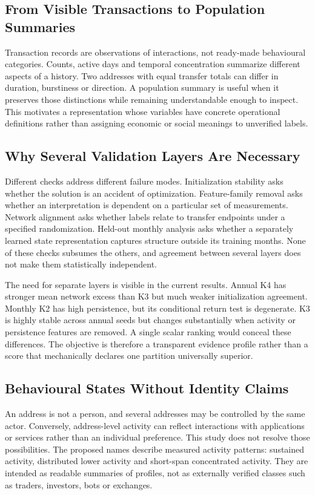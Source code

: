 \subsection{From Visible Transactions to Population Summaries}
Transaction records are observations of interactions, not ready-made behavioural categories. Counts, active days and temporal concentration summarize different aspects of a history. Two addresses with equal transfer totals can differ in duration, burstiness or direction. A population summary is useful when it preserves those distinctions while remaining understandable enough to inspect. This motivates a representation whose variables have concrete operational definitions rather than assigning economic or social meanings to unverified labels.

\subsection{Why Several Validation Layers Are Necessary}
Different checks address different failure modes. Initialization stability asks whether the solution is an accident of optimization. Feature-family removal asks whether an interpretation is dependent on a particular set of measurements. Network alignment asks whether labels relate to transfer endpoints under a specified randomization. Held-out monthly analysis asks whether a separately learned state representation captures structure outside its training months. None of these checks subsumes the others, and agreement between several layers does not make them statistically independent.

The need for separate layers is visible in the current results. Annual K4 has stronger mean network excess than K3 but much weaker initialization agreement. Monthly K2 has high persistence, but its conditional return test is degenerate. K3 is highly stable across annual seeds but changes substantially when activity or persistence features are removed. A single scalar ranking would conceal these differences. The objective is therefore a transparent evidence profile rather than a score that mechanically declares one partition universally superior.

\subsection{Behavioural States Without Identity Claims}
An address is not a person, and several addresses may be controlled by the same actor. Conversely, address-level activity can reflect interactions with applications or services rather than an individual preference. This study does not resolve those possibilities. The proposed names describe measured activity patterns: sustained activity, distributed lower activity and short-span concentrated activity. They are intended as readable summaries of profiles, not as externally verified classes such as traders, investors, bots or exchanges.

